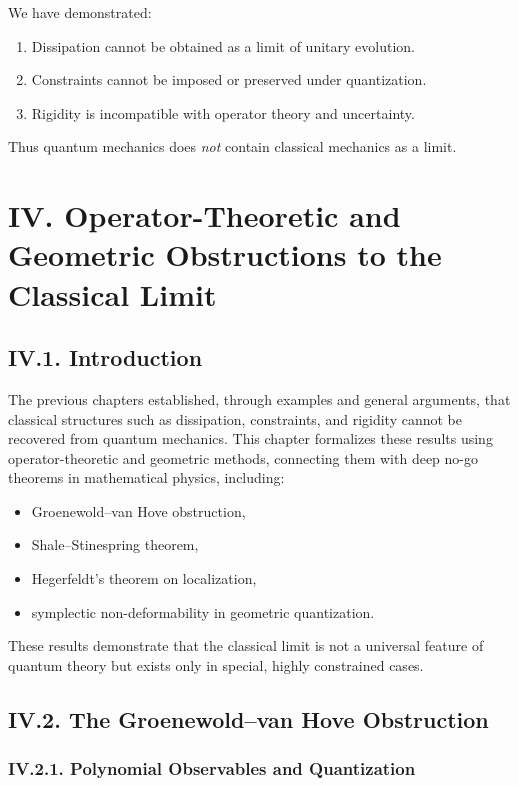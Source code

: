 \documentclass[12pt,oneside]{book}
\theoremstyle{plain}
\theoremstyle{definition}
\begin{document}
We have demonstrated:

\begin{enumerate}
    \item Dissipation cannot be obtained as a limit of unitary evolution.
    \item Constraints cannot be imposed or preserved under quantization.
    \item Rigidity is incompatible with operator theory and uncertainty.
\end{enumerate}

Thus quantum mechanics does \emph{not} contain classical mechanics as a limit.


\chapter{IV. Operator-Theoretic and Geometric Obstructions to the Classical Limit}

\section{IV.1. Introduction}

The previous chapters established, through examples and general arguments, that classical structures such as dissipation, constraints, and rigidity cannot be recovered from quantum mechanics. This chapter formalizes these results using operator-theoretic and geometric methods, connecting them with deep no-go theorems in mathematical physics, including:

\begin{itemize}
    \item Groenewold–van Hove obstruction,
    \item Shale–Stinespring theorem,
    \item Hegerfeldt’s theorem on localization,
    \item symplectic non-deformability in geometric quantization.
\end{itemize}

These results demonstrate that the classical limit is not a universal feature of quantum theory but exists only in special, highly constrained cases.

\section{IV.2. The Groenewold–van Hove Obstruction}

\subsection*{IV.2.1. Polynomial Observables and Quantization}
\end{document}
